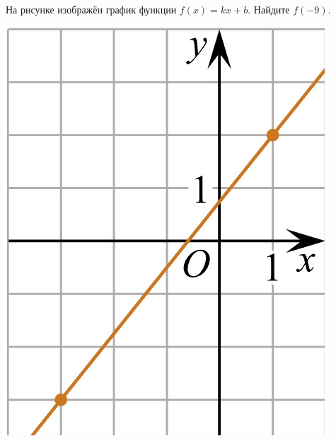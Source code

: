 %
%
\begin{class}[number=4]
	\begin{listofex}
		\item
		\begin{minipage}[t]{0.67\textwidth}
			На рисунке изображён график функции \(f(x)=kx+b\). Найдите \(f(-9)\).
		\end{minipage}
		\begin{minipage}[c]{0.25\textwidth}
			\includegraphics[align=t, width=\textwidth]{pics/G101M4C4-1.jpg}
		\end{minipage}
		\item
		\begin{minipage}[t]{0.82\textwidth}

\end{minipage}
\end{listofex}
\end{class}
